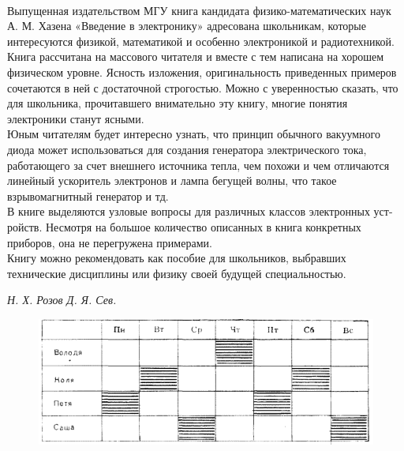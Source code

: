 \begin{multicols}{3}
\\Выпущенная издательством МГУ книга кандидата
физико-математических наук А. М. Хазена «Введение в электронику» адресована школьникам, которые интересуются физикой, математикой и особенно электроникой и радиотехникой.
\\Книга рассчитана на массового читателя и вместе с тем написана на хорошем физическом уровне. Ясность изложения, оригинальность приведенных примеров сочетаются в ней с достаточной строгостью. Можно с уверенностью сказать, что для школьника, прочитавшего внимательно эту книгу, многие понятия электроники станут ясными.
\\Юным читателям будет
интересно узнать, что принцип обычного вакуумного диода может использоваться для создания генератора электрического тока, работающего за счет внешнего источника тепла, чем похожи и чем отличаются линейный ускоритель электронов и лампа бегущей волны, что такое взрывомагнитный генератор и тд.
\\ В книге выделяются узловые вопросы для различных классов электронных уст-
ройств. Несмотря на большое количество описанных в книга конкретных приборов, она не перегружена примерами.
\\ Книгу можно рекомендовать как пособие для школьников, выбравших технические дисциплины или физику своей будущей специальностью.

\vfill %
\end{multicols}
\hfill \textit{Н. Х. Розов \hspace{2cm} Д. Я. Сев.}
\vspace{1cm}

\newpage
\begin{figure}[H]

\centering

\includegraphics[width=1\linewidth]{lab6/image.png}

\label{fig:mpr}

\end{figure}

